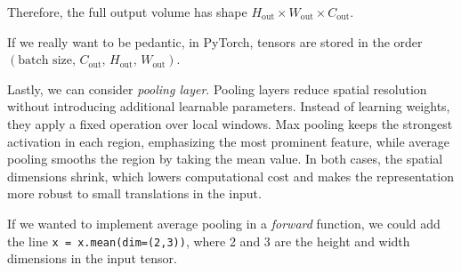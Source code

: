 Therefore, the full output volume has shape
$H_{\text{out}} \times W_{\text{out}} \times C_{\text{out}}$.

If we really want to be pedantic, in PyTorch, tensors are stored in the order $(\text{batch size},\, C_{\text{out}},\, H_{\text{out}},\, W_{\text{out}})$.

\medskip

Lastly, we can consider \textit{pooling layer}. Pooling layers reduce spatial resolution without introducing additional learnable parameters. Instead of learning weights, they apply a fixed operation over local windows. Max pooling keeps the strongest activation in each region, emphasizing the most prominent feature, while average pooling smooths the region by taking the mean value. In both cases, the spatial dimensions shrink, which lowers computational cost and makes the representation more robust to small translations in the input.

If we wanted to implement average pooling in a \textit{forward} function, we could add the line \texttt{x = x.mean(dim=(2,3))}, where 2 and 3 are the height and width dimensions in the input tensor.

\bigskip

